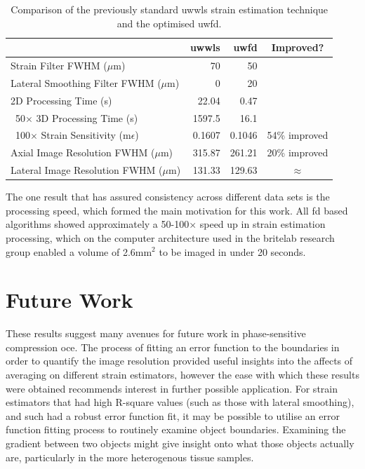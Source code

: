 \begin{table}[b!]
	\begin{tabularx}{\textwidth}{Yrrc}
		\toprule
		& \textbf{\ac{uwwls}} & \textbf{\ac{uwfd}} & \textbf{Improved?}\\
		\midrule 
		Strain Filter FWHM ($\mu$m) & 70 & 50 \\
		Lateral Smoothing Filter FWHM ($\mu$m) & 0 & 20 \\
		\midrule
		2D Processing Time (s) & 22.04 & 0.47\\ ~50$\times$
		3D Processing Time (s) & 1597.5 & 16.1\\ ~100$\times$
		Strain Sensitivity (m$\epsilon$) & 0.1607 & 0.1046 & 54\% improved \\
		Axial Image Resolution FWHM ($\mu$m) & 315.87 & 261.21 & 20\% improved \\
		Lateral Image Resolution FWHM ($\mu$m) & 131.33 & 129.63 & $\approx$ \\
		\bottomrule
	\end{tabularx}
	\caption{Comparison of the previously standard \ac{uwwls} strain estimation technique and the optimised \ac{uwfd}.}
	\label{comparison_table}
\end{table}

The one result that has assured consistency across different data sets is the processing speed, which formed the main motivation for this work. All \ac{fd} based algorithms showed approximately a 50-100$\times$ speed up in strain estimation processing, which on the computer architecture used in the \ac{britelab} research group enabled a volume of 2.6$\text{mm}^2$ to be imaged in under 20 seconds.

\section{Future Work}

These results suggest many avenues for future work in phase-sensitive compression \ac{oce}. The process of fitting an error function to the boundaries in order to quantify the image resolution provided useful insights into the affects of averaging on different strain estimators, however the ease with which these results were obtained recommends interest in further possible application. For strain estimators that had high R-square values (such as those with lateral smoothing), and such had a robust error function fit, it may be possible to utilise an error function fitting process to routinely examine object boundaries. Examining the gradient between two objects might give insight onto what those objects actually are, particularly in the more heterogenous tissue samples. 

